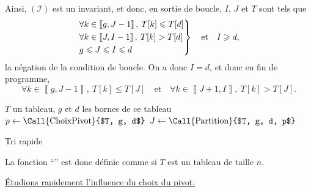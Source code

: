 \begin{prv}
	Ainsi, $(\mathcal{I})$\/ est un invariant, et donc, en sortie de boucle, $I$, $J$\/ et $T$\/ sont tels que \[
		\begin{rcases*}
			\forall k \in \left\llbracket g, J-1 \right\rrbracket,\: T[k] \le T[d]\\
			\forall k \in \left\llbracket J, I - 1 \right\rrbracket,\: T[k] > T[d]\\
			g \le J \le I \le d
		\end{rcases*} \quad \text{et} \quad I \ge d,
	\] la négation de la condition de boucle. On a donc $I = d$, et donc en fin de programme, \[
		\forall k \in \left\llbracket g, J-1 \right\rrbracket,\:T[k] \le T[J]
		\quad\text{et}\quad
		\forall k \in \left\llbracket J+1,I \right\rrbracket,\:T[k] > T[J]
	.\]
\end{prv}

\begin{algorithm}[H]
	\centering
	\begin{algorithmic}[1]
		\Entree $T$\/ un tableau, $g$\/ et $d$\/ les bornes de ce tableau
			\State $p \gets \text{\Call{ChoixPivot}{$T, g, d$}}$
			\State $J \gets \text{\Call{Partition}{$T, g, d, p$}}$
			\State {}
			\State {}
		\EndIf
	\end{algorithmic}
	\caption{Tri rapide}
\end{algorithm}

La fonction ``'' est donc définie comme  si $T$\/ est un tableau de taille $n$.

\noindent\centerline{\underline{Étudions rapidement l'influence du choix du pivot.}}

